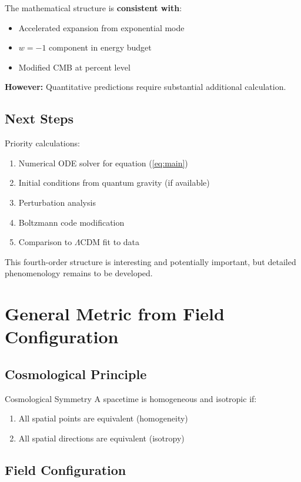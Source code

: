 \documentclass[11pt,a4paper]{article}
\theoremstyle{definition}
\theoremstyle{remark}
\begin{document}
	The mathematical structure is \textbf{consistent with}:
	\begin{itemize}
		\item Accelerated expansion from exponential mode
		\item $w = -1$ component in energy budget
		\item Modified CMB at percent level
	\end{itemize}
	
	\textbf{However:} Quantitative predictions require substantial additional calculation.
	
	\subsection{Next Steps}
	
	Priority calculations:
	\begin{enumerate}
		\item Numerical ODE solver for equation (\ref{eq:main})
		\item Initial conditions from quantum gravity (if available)
		\item Perturbation analysis
		\item Boltzmann code modification
		\item Comparison to $\Lambda$CDM fit to data
	\end{enumerate}
	
	This fourth-order structure is interesting and potentially important, but detailed phenomenology remains to be developed.
	
	\section{General Metric from Field Configuration}
	
	\subsection{Cosmological Principle}
	
	Cosmological Symmetry
		A spacetime is homogeneous and isotropic if:
		\begin{enumerate}
			\item All spatial points are equivalent (homogeneity)
			\item All spatial directions are equivalent (isotropy)
		\end{enumerate}
	
	\subsection{Field Configuration}
	
\end{document}
